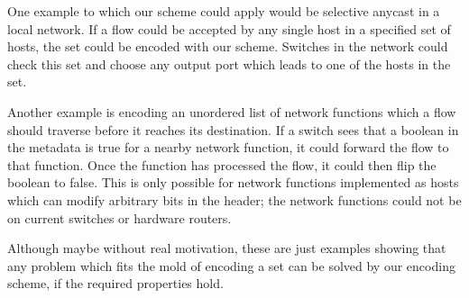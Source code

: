 One example to which our scheme could apply would be selective anycast in a local network. If a flow could be accepted by any single host in a specified set of hosts, the set could be encoded with our scheme. Switches in the network could check this set and choose any output port which leads to one of the hosts in the set.

Another example is encoding an unordered list of network functions which a flow should traverse before it reaches its destination. If a switch sees that a boolean in the metadata is true for a nearby network function, it could forward the flow to that function. Once the function has processed the flow, it could then flip the boolean to false. This is only possible for network functions implemented as hosts which can modify arbitrary bits in the header; the network functions could not be on current switches or hardware routers.

Although maybe without real motivation, these are just examples showing that any problem which fits the mold of encoding a set can be solved by our encoding scheme, if the required properties hold. 

